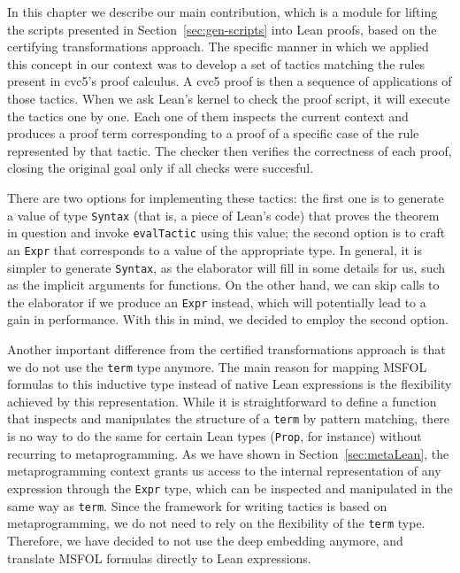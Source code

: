 In this chapter we describe our main contribution, which is a module
for lifting the scripts presented in Section~\ref{sec:gen-scripts} into
Lean proofs, based on the certifying transformations approach.
%
The specific manner in which we applied
this concept in our context was to develop a set of tactics matching
the rules present in cvc5's proof calculus.
A cvc5 proof is then a sequence of applications of those tactics.
When we ask Lean's kernel to check the proof script, it will execute the tactics
one by one. Each one of them inspects the current context
and produces a proof term corresponding to a proof of a specific
case of the rule represented by that tactic.
The checker then verifies the correctness of each proof, closing the original goal only
if all checks were succesful.

There are two options for implementing these tactics: the first one is to generate
a value of type \texttt{Syntax} (that is, a piece of Lean's code) that proves
the theorem in question and invoke \texttt{evalTactic} using this value;
the second option is to craft an \texttt{Expr} that corresponds to a value
of the appropriate type. In general,
it is simpler to generate \texttt{Syntax}, as the elaborator will fill in
some details for us, such as the implicit arguments for functions. On the
other hand, we can skip calls to the elaborator if we produce an \texttt{Expr}
instead, which will potentially lead to a gain in performance. With this in mind,
we decided to employ the second option.


Another important difference from the certified transformations approach is that we do not use the \texttt{term}
type anymore. The main reason for mapping MSFOL formulas to this inductive type
instead of native Lean expressions is the flexibility achieved by this representation.
While it is straightforward to define a function that inspects and manipulates the structure of
a \texttt{term} by pattern matching, there is no way to do the same for certain Lean types (\texttt{Prop}, for
instance) without recurring to metaprogramming. As we have shown in Section~\ref{sec:metaLean},
the metaprogramming context grants us access to the internal representation of any expression
through the \texttt{Expr} type, which can be inspected and manipulated in the same way
as \texttt{term}. Since the framework for writing tactics is based on metaprogramming, we
do not need to rely on the flexibility of the \texttt{term} type. Therefore, we
have decided to not use the deep embedding anymore, and translate MSFOL formulas directly
to Lean expressions.

